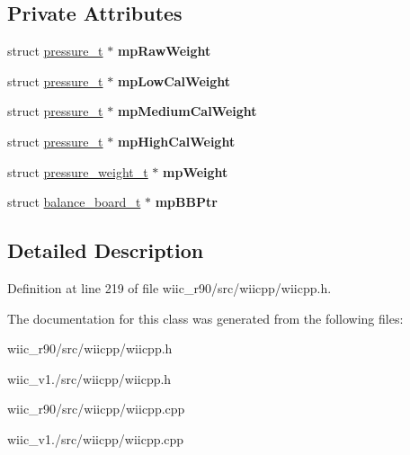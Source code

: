 \subsection*{Private Attributes}
\begin{DoxyCompactItemize}
\item 
\hypertarget{class_c_weight_sensor_a51f3f16e4dcf5f14bfad1964370b9646}{struct \hyperlink{structpressure__t}{pressure\-\_\-t} $\ast$ {\bfseries mp\-Raw\-Weight}}\label{class_c_weight_sensor_a51f3f16e4dcf5f14bfad1964370b9646}

\item 
\hypertarget{class_c_weight_sensor_acd522228405fa80a189d65abd50f3fa6}{struct \hyperlink{structpressure__t}{pressure\-\_\-t} $\ast$ {\bfseries mp\-Low\-Cal\-Weight}}\label{class_c_weight_sensor_acd522228405fa80a189d65abd50f3fa6}

\item 
\hypertarget{class_c_weight_sensor_a9e92084c2eb934d967df6363e558275d}{struct \hyperlink{structpressure__t}{pressure\-\_\-t} $\ast$ {\bfseries mp\-Medium\-Cal\-Weight}}\label{class_c_weight_sensor_a9e92084c2eb934d967df6363e558275d}

\item 
\hypertarget{class_c_weight_sensor_afb560c691b854a3a6e31bc51ef264270}{struct \hyperlink{structpressure__t}{pressure\-\_\-t} $\ast$ {\bfseries mp\-High\-Cal\-Weight}}\label{class_c_weight_sensor_afb560c691b854a3a6e31bc51ef264270}

\item 
\hypertarget{class_c_weight_sensor_abbbedbb3333fbb3717815b4b7953cd75}{struct \hyperlink{structpressure__weight__t}{pressure\-\_\-weight\-\_\-t} $\ast$ {\bfseries mp\-Weight}}\label{class_c_weight_sensor_abbbedbb3333fbb3717815b4b7953cd75}

\item 
\hypertarget{class_c_weight_sensor_a803935fde640ea62c7904f8703e2c479}{struct \hyperlink{structbalance__board__t}{balance\-\_\-board\-\_\-t} $\ast$ {\bfseries mp\-B\-B\-Ptr}}\label{class_c_weight_sensor_a803935fde640ea62c7904f8703e2c479}

\end{DoxyCompactItemize}


\subsection{Detailed Description}


Definition at line 219 of file wiic\-\_\-r90/src/wiicpp/wiicpp.\-h.



The documentation for this class was generated from the following files\-:\begin{DoxyCompactItemize}
\item 
wiic\-\_\-r90/src/wiicpp/wiicpp.\-h\item 
wiic\-\_\-v1./src/wiicpp/wiicpp.\-h\item 
wiic\-\_\-r90/src/wiicpp/wiicpp.\-cpp\item 
wiic\-\_\-v1./src/wiicpp/wiicpp.\-cpp\end{DoxyCompactItemize}
